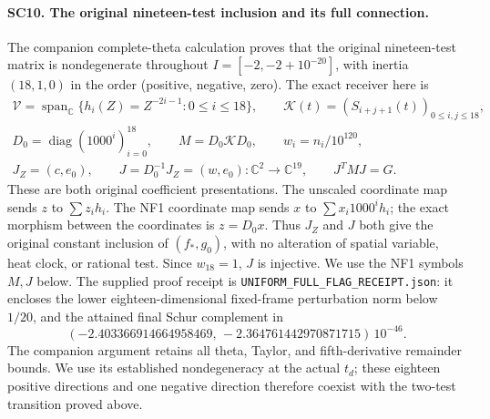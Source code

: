 \paragraph{SC10. The original nineteen-test inclusion and its full connection.}
The companion complete-theta calculation proves that the
original nineteen-test matrix is nondegenerate throughout
\(I=[-2,-2+10^{-20}]\), with inertia \((18,1,0)\) in the order
(positive, negative, zero). The exact receiver here is
\[
 \begin{gathered}
 \mathcal V=\operatorname{span}_{\mathbb C}
      \{h_i(Z)=Z^{-2i-1}:0\le i\le18\},\qquad
 \mathcal K(t)=(S_{i+j+1}(t))_{0\le i,j\le18},\\
 D_0=\operatorname{diag}(1000^i)_{i=0}^{18},\qquad
 M=D_0\mathcal KD_0,\qquad w_i=n_i/10^{120},\\
 J_Z=(c,e_0),\qquad
 J=D_0^{-1}J_Z=(w,e_0)
 :\mathbb C^2\longrightarrow\mathbb C^{19},\qquad
 J^TMJ=G .
 \end{gathered}\tag{SC36}
\]
These are both original coefficient presentations. The
unscaled coordinate map sends \(z\) to \(\sum z_i h_i\).
The NF1 coordinate map sends \(x\) to
\(\sum x_i1000^i h_i\); the exact morphism between the
coordinates is \(z=D_0x\). Thus \(J_Z\) and \(J\) both give
the original constant inclusion of \((f_*,g_0)\), with no
alteration of spatial variable, heat clock, or rational test.
Since \(w_{18}=1\), \(J\) is injective. We use the NF1
symbols \(M,J\) below. The supplied proof receipt is
\texttt{UNIFORM\_FULL\_FLAG\_RECEIPT.json}: it encloses the
lower eighteen-dimensional fixed-frame perturbation norm
below \(1/20\), and the attained final Schur complement in
\[
 (-2.403366914664958469,\,-2.364761442970871715)\,10^{-46}.
 \tag{SC37}
\]
The companion argument retains all theta, Taylor, and
fifth-derivative remainder bounds. We use its established
nondegeneracy at the actual \(t_d\); these eighteen positive
directions and one negative direction therefore coexist with
the two-test transition proved above.

